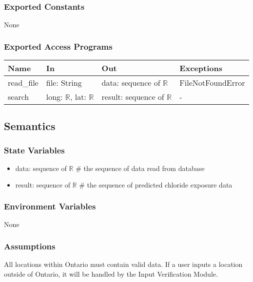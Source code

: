 \documentclass[12pt, titlepage]{article}
\begin{document}
\subsubsection{Exported Constants}
None
\subsubsection{Exported Access Programs}

\begin{center}
\begin{tabular}{p{2cm} p{4cm} p{4cm} p{4cm}}
\hline
\textbf{Name} & \textbf{In} & \textbf{Out} & \textbf{Exceptions} \\
\hline
read\_file & file: String & data: sequence of $\mathbb{R}$ & FileNotFoundError \\
search & long: $\mathbb{R}$, lat: $\mathbb{R}$  & result: sequence of  $\mathbb{R}$ & - \\
\hline
\end{tabular}
\end{center}

\subsection{Semantics}

\subsubsection{State Variables}
\begin{itemize}
\item data: sequence of $\mathbb{R}$ \# the sequence of data read from database
\item result: sequence of $\mathbb{R}$ \# the sequence of predicted chloride exposure data

\end{itemize}

\subsubsection{Environment Variables}
None

\subsubsection{Assumptions}
All locations within Ontario must contain valid data. If a user inputs a location outside of Ontario, it will be handled by the Input Verification Module.
\end{document}
